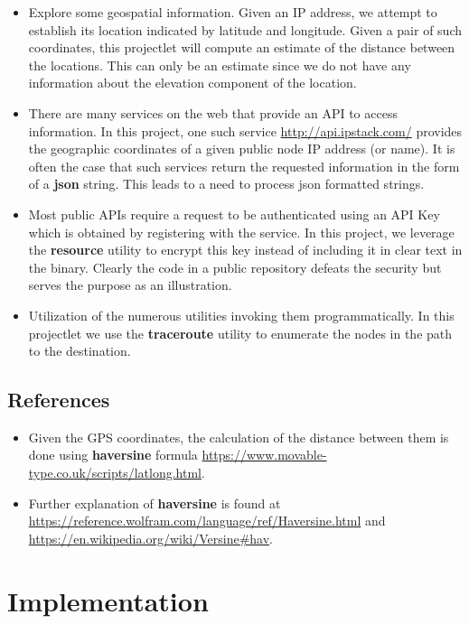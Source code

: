 \documentclass[12pt, a4paper]{article} %
\begin{document}
\begin{itemize}
    \item Explore some geospatial information. Given an IP address, we attempt to establish its location indicated by latitude and longitude. Given a pair of such coordinates, this projectlet will compute an estimate of the distance between the locations. This can only be an estimate since we do not have any information about the elevation component of the location.
    \item There are many services on the web that provide an API to access information. In this project, one such service \url{http://api.ipstack.com/} provides the geographic coordinates of a given public node IP address (or name). It is often the case that such services return the requested information in the form of a \textbf{json} string. This leads to a need to process json formatted strings.
    \item Most public APIs require a request to be authenticated using an API Key which is obtained by registering with the service. In this project, we leverage the \textbf{resource} utility to encrypt this key instead of including it in clear text in the binary. Clearly the code in a public repository defeats the security but serves the purpose as an illustration.
    \item Utilization of the numerous utilities invoking them programmatically. In this projectlet we use the \textbf{traceroute} utility to enumerate the nodes in the path to the destination.
\end{itemize}

\subsection{References}
\begin{itemize}
    \item Given the GPS coordinates, the calculation of the distance between them is done using \textbf{haversine} formula \url{https://www.movable-type.co.uk/scripts/latlong.html}.
    \item Further explanation of \textbf{haversine} is found at \url{https://reference.wolfram.com/language/ref/Haversine.html} and \url{https://en.wikipedia.org/wiki/Versine#hav}.
\end{itemize}
\section{Implementation}
\end{document}

